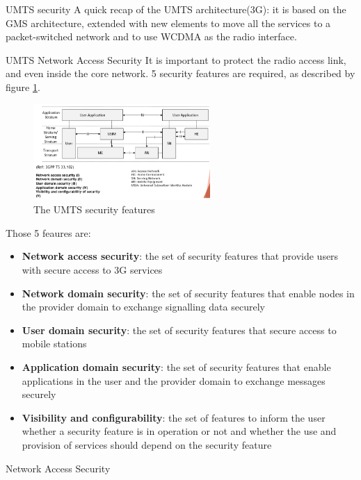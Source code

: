   \begin{section}{UMTS security}
    A quick recap of the UMTS architecture(3G): it is based on the GMS architecture, extended with
    new elements to move all the services to a packet-switched network and to use WCDMA as the radio
    interface. 
    \begin{subsection}{UMTS Network Access Security}
      It is important to protect the radio access link, and even inside the core network.
      5 security features are required, as described by figure \ref{fig:umts-security}.
      \begin{figure}[h]
        \centering
        \includegraphics[width=0.6\textwidth]{img/wireless/umts security features.png}
        \caption{The UMTS security features}
        \label{fig:umts-security}
      \end{figure}
      Those 5 feaures are:
      \begin{itemize}
        \item \textbf{Network access security}: the set of security features that provide users with
          secure access to 3G services
        \item \textbf{Network domain security}: the set of security features that enable nodes in the
          provider domain to exchange signalling data securely
        \item \textbf{User domain security}: the set of security features that secure access to mobile
          stations
        \item \textbf{Application domain security}: the set of security features that enable
          applications in the user and the provider domain to exchange messages securely
        \item \textbf{Visibility and configurability}:  the set of features to inform the user
          whether a security feature is in operation or not and whether the use and provision of
          services should depend on the security feature
      \end{itemize}
      \begin{subsubsection}{Network Access Security}

\end{subsubsection}
\end{subsection}
\end{section}
